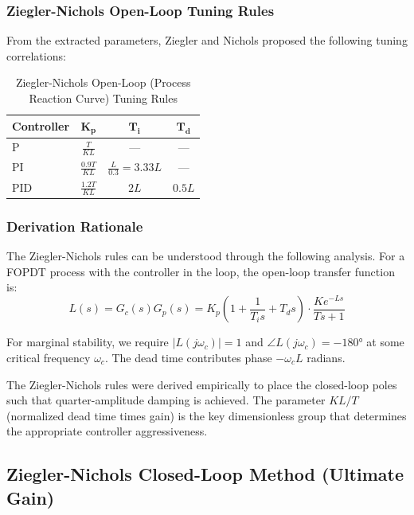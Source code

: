 \subsubsection{Ziegler-Nichols Open-Loop Tuning Rules}

From the extracted parameters, Ziegler and Nichols proposed the following tuning correlations:

\begin{table}[htbp]
\centering
\caption{Ziegler-Nichols Open-Loop (Process Reaction Curve) Tuning Rules}
\label{tab:zn_open_loop}
\begin{tabular}{lccc}
\toprule
\textbf{Controller} & $\boldsymbol{K_p}$ & $\boldsymbol{T_i}$ & $\boldsymbol{T_d}$ \\
\midrule
P & $\displaystyle\frac{T}{KL}$ & --- & --- \\[2ex]
PI & $\displaystyle\frac{0.9T}{KL}$ & $\displaystyle\frac{L}{0.3} = 3.33L$ & --- \\[2ex]
PID & $\displaystyle\frac{1.2T}{KL}$ & $2L$ & $0.5L$ \\
\bottomrule
\end{tabular}
\end{table}

\subsubsection{Derivation Rationale}

The Ziegler-Nichols rules can be understood through the following analysis. For a FOPDT process with the controller in the loop, the open-loop transfer function is:
\begin{equation}
    L(s) = G_c(s)G_p(s) = K_p\left(1 + \frac{1}{T_i s} + T_d s\right) \cdot \frac{K e^{-Ls}}{Ts + 1}
\end{equation}

For marginal stability, we require $|L(j\omega_c)| = 1$ and $\angle L(j\omega_c) = -180°$ at some critical frequency $\omega_c$. The dead time contributes phase $-\omega_c L$ radians.

The Ziegler-Nichols rules were derived empirically to place the closed-loop poles such that quarter-amplitude damping is achieved. The parameter $KL/T$ (normalized dead time times gain) is the key dimensionless group that determines the appropriate controller aggressiveness.

\subsection{Ziegler-Nichols Closed-Loop Method (Ultimate Gain)}

